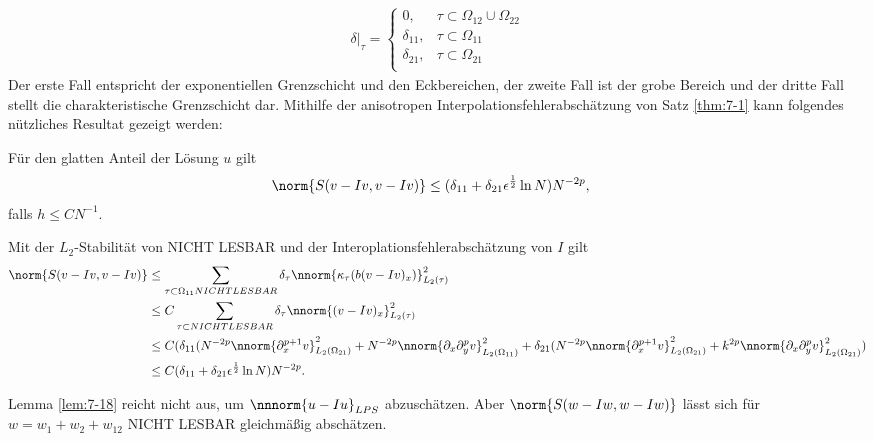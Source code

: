 \begin{align*}
  \delta|_{\tau} =
  \begin{cases}
    0, & \tau \subset \Omega_{12} \cup \Omega_{22}\\
    \delta_{11}, & \tau \subset \Omega_{11} \\
    \delta_{21}, & \tau \subset \Omega_{21} \\
  \end{cases}
\end{align*}
Der erste Fall entspricht der exponentiellen Grenzschicht und den Eckbereichen, der zweite Fall ist der grobe Bereich und der dritte Fall stellt die charakteristische Grenzschicht dar. Mithilfe der anisotropen Interpolationsfehlerabschätzung von Satz \ref{thm:7-1} kann folgendes nützliches Resultat gezeigt werden:
\begin{lemma}\label{lem:7-18}
  Für den glatten Anteil der Lösung $u$ gilt
  \begin{align*}
    \norm{S(v - Iv, v-Iv)} & \leq (\delta_{11} + \delta_{21}\epsilon^{\frac 12} \ln N)N^{-2p}, 
  \end{align*}
falls $h \leq CN^{-1}$. 
\end{lemma}
\begin{beweis}
  Mit der $L_{2}$-Stabilität von NICHT LESBAR und der Interoplationsfehlerabschätzung von $I$ gilt
  \begin{align*}
\norm{S(v - Iv, v-Iv)} & \leq \sum_{\tau \subset \Omega_{11} NICHT LESBAR} \delta_{\tau} \nnorm{\kappa_{\tau}(b(v-Iv)_{x})}_{L_{2}(\tau)}^{2}\\
& \leq C \sum_{\tau \subset NICHT LESBAR} \delta_{\tau} \nnorm{(v-Iv)_{x}}_{L_{2}(\tau)}^{2}\\
& \leq C (\delta_{11}(N^{-2p} \nnorm{\partial_{x}^{p+1}v}_{L_{2}(\Omega_{21})}^{2} + N^{-2p} \nnorm{\partial_{x}\partial_{y}^{p}v}^{2}_{L_{2}(\Omega_{11})}+ \delta_{21} (N^{-2p}\nnorm{\partial_{x}^{p+1}v}^{2}_{L_{2}(\Omega_{21})} + k^{2p} \nnorm{\partial_{x}\partial_{y}^{p}v}^{2}_{L_{2}(\Omega_{21})})\\
& \leq C (\delta_{11} + \delta_{21}\epsilon^{\frac 12} \ln N)N^{-2p}. 
  \end{align*}
\end{beweis}

Lemma \ref{lem:7-18} reicht nicht aus, um $\nnnorm{u - Iu}_{LPS}$ abzuschätzen. Aber $\norm{S(w - Iw, w- Iw)}$ lässt sich für $w = w_{1} + w_{2} + w_{12}$ NICHT LESBAR gleichmäßig abschätzen. 

